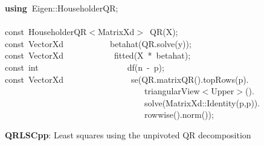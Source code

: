 \documentclass[shortnames,article]{jss}
\newcommand{\hlstd}[1]{\textcolor[rgb]{0,0,0}{#1}}
\newcommand{\hlopt}[1]{\textcolor[rgb]{0,0,0}{#1}}
\newcommand{\hlkwa}[1]{\textcolor[rgb]{0.61,0.13,0.93}{\bf{#1}}}
\newcommand{\hlkwb}[1]{\textcolor[rgb]{0.13,0.54,0.13}{#1}}
\newcommand{\hlkwd}[1]{\textcolor[rgb]{0,0,0}{#1}}
\begin{document}
\begin{figure}[htb]
    \noindent
    \ttfamily
    \hlstd{}\hlkwa{using\ }\hlstd{Eigen}\hlopt{::}\hlstd{HouseholderQR}\hlopt{;}\hspace*{\fill}\\
    \hlstd{}\hspace*{\fill}\\
    \hlkwb{const\ }\hlstd{HouseholderQR}\hlopt{$<$}\hlstd{MatrixXd}\hlopt{$>$\ }\hlstd{}\hlkwd{QR}\hlstd{}\hlopt{(}\hlstd{X}\hlopt{);}\hspace*{\fill}\\
    \hlstd{}\hlkwb{const\ }\hlstd{VectorXd}\hlstd{\ \ \ \ \ \ \ \ \ \ \ }\hlstd{}\hlkwd{betahat}\hlstd{}\hlopt{(}\hlstd{QR}\hlopt{.}\hlstd{}\hlkwd{solve}\hlstd{}\hlopt{(}\hlstd{y}\hlopt{));}\hspace*{\fill}\\
    \hlstd{}\hlkwb{const\ }\hlstd{VectorXd}\hlstd{\ \ \ \ \ \ \ \ \ \ \ \ }\hlstd{}\hlkwd{fitted}\hlstd{}\hlopt{(}\hlstd{X\ }\hlopt{{*}\ }\hlstd{betahat}\hlopt{);}\hspace*{\fill}\\
    \hlstd{}\hlkwb{const\ int}\hlstd{\ \ \ \ \ \ \ \ \ \ \ \ \ \ \ \ \ \ \ \ \ }\hlkwb{}\hlstd{}\hlkwd{df}\hlstd{}\hlopt{(}\hlstd{n\ }\hlopt{{-}\ }\hlstd{p}\hlopt{);}\hspace*{\fill}\\
    \hlstd{}\hlkwb{const\ }\hlstd{VectorXd}\hlstd{\ \ \ \ \ \ \ \ \ \ \ \ \ \ \ \ }\hlstd{}\hlkwd{se}\hlstd{}\hlopt{(}\hlstd{QR}\hlopt{.}\hlstd{}\hlkwd{matrixQR}\hlstd{}\hlopt{().}\hlstd{}\hlkwd{topRows}\hlstd{}\hlopt{(}\hlstd{p}\hlopt{).}\hspace*{\fill}\\
    \hlstd{}\hlstd{\ \ \ \ \ \ \ \ \ \ \ \ \ \ \ \ \ \ \ \ \ \ \ \ \ \ \ \ \ \ \ \ \ }\hlstd{triangularView}\hlopt{$<$}\hlstd{Upper}\hlopt{$>$().}\hspace*{\fill}\\
    \hlstd{}\hlstd{\ \ \ \ \ \ \ \ \ \ \ \ \ \ \ \ \ \ \ \ \ \ \ \ \ \ \ \ \ \ \ \ \ }\hlstd{}\hlkwd{solve}\hlstd{}\hlopt{(}\hlstd{MatrixXd}\hlopt{::}\hlstd{}\hlkwd{Identity}\hlstd{}\hlopt{(}\hlstd{p}\hlopt{,}\hlstd{p}\hlopt{)).}\hspace*{\fill}\\
    \hlstd{}\hlstd{\ \ \ \ \ \ \ \ \ \ \ \ \ \ \ \ \ \ \ \ \ \ \ \ \ \ \ \ \ \ \ \ \ }\hlstd{}\hlkwd{rowwise}\hlstd{}\hlopt{().}\hlstd{}\hlkwd{norm}\hlstd{}\hlopt{());}\hlstd{}\hspace*{\fill}
    \normalfont
    \normalsize
    \caption{\textbf{QRLSCpp}: Least squares using the unpivoted QR decomposition}
    \label{QRLS}
\end{figure}
\end{document}
